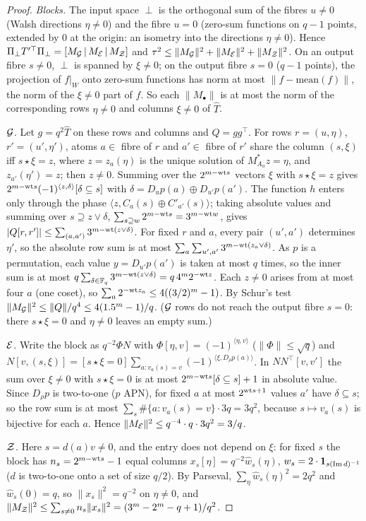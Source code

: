 \begin{proof}
\emph{Blocks.} The input space $\perp$ is the orthogonal sum of the fibres $u\ne0$ (Walsh directions $\eta\ne0$)
and the fibre $u=0$ (zero-sum functions on $q-1$ points, extended by $0$ at the origin: an isometry into the
directions $\eta\ne0$). Hence $\Pi_\perp T'^\top\Pi_\perp=[M_{\mathcal{G}}\,|\,M_{\mathcal{E}}\,|\,M_{\mathcal{Z}}]$ and
$\tau^2\le\|M_{\mathcal{G}}\|^2+\|M_{\mathcal{E}}\|^2+\|M_{\mathcal{Z}}\|^2$. On an output fibre $s\ne0$, $\perp$ is spanned by $\xi\ne0$; on the
output fibre $s=0$ ($q-1$ points), the projection of $f|_W$ onto zero-sum functions has norm at most
$\|f-\mathrm{mean}(f)\|$, the norm of the $\xi\ne0$ part of $f$. So each $\|M_\bullet\|$ is at most the norm of the
corresponding rows $\eta\ne0$ and columns $\xi\ne0$ of $\widehat T$.

\emph{$\mathcal{G}$.} Let $g=q^2\widehat T$ on these rows and columns and $Q=gg^\top$. For rows $r=(u,\eta)$, $r'=(u',\eta')$,
atoms $a\in$ fibre of $r$ and $a'\in$ fibre of $r'$ share the column $(s,\xi)$ iff $s\star\xi=z$, where $z=z_a(\eta)$ is the
unique solution of $M^\ast_{A_a}z=\eta$, and $z_{a'}(\eta')=z$; then $z\ne0$. Summing over the $2^{m-\mathrm{wt} s}$ vectors $\xi$
with $s\star\xi=z$ gives $2^{m-\mathrm{wt} s}(-1)^{\langle z,\delta\rangle}[\delta\subseteq s]$ with
$\delta=D_up(a)\oplus D_{u'}p(a')$. The function $h$ enters only through the phase $\langle z,C_a(s)\oplus C'_{a'}(s)\rangle$;
taking absolute values and summing over $s\supseteq z\vee\delta$, $\sum_{s\supseteq w}2^{m-\mathrm{wt} s}=3^{m-\mathrm{wt} w}$, gives
$|Q[r,r']|\le\sum_{(a,a')}3^{m-\mathrm{wt}(z\vee\delta)}$. For fixed $r$ and $a$, every pair $(u',a')$ determines $\eta'$, so the
absolute row sum is at most $\sum_a\sum_{u',a'}3^{m-\mathrm{wt}(z_a\vee\delta)}$. As $p$ is a permutation, each value
$y=D_{u'}p(a')$ is taken at most $q$ times, so the inner sum is at most
$q\sum_{\delta\in\mathbb{F}_q}3^{m-\mathrm{wt}(z\vee\delta)}=q\,4^m2^{-\mathrm{wt} z}$. Each $z\ne0$ arises from at most four $a$ (one coset), so
$\sum_a2^{-\mathrm{wt} z_a}\le4((3/2)^m-1)$. By Schur's test $\|M_{\mathcal{G}}\|^2\le\|Q\|/q^4\le4(1.5^m-1)/q$. ($\mathcal{G}$ rows do not reach
the output fibre $s=0$: there $s\star\xi=0$ and $\eta\ne0$ leaves an empty sum.)

\emph{$\mathcal{E}$.} Write the block as $q^{-2}\Phi N$ with $\Phi[\eta,v]=(-1)^{\langle\eta,v\rangle}$ ($\|\Phi\|\le\sqrt q$) and
$N[v,(s,\xi)]=[s\star\xi=0]\sum_{a:v_a(s)=v}(-1)^{\langle\xi,D_\rho p(a)\rangle}$. In $NN^\top[v,v']$ the sum over $\xi\ne0$
with $s\star\xi=0$ is at most $2^{m-\mathrm{wt} s}[\delta\subseteq s]+1$ in absolute value. Since $D_\rho p$ is two-to-one ($p$ APN),
for fixed $a$ at most $2^{\mathrm{wt} s+1}$ values $a'$ have $\delta\subseteq s$; so the row sum is at most
$\sum_s\#\{a:v_a(s)=v\}\cdot3q=3q^2$, because $s\mapsto v_a(s)$ is bijective for each $a$. Hence
$\|M_{\mathcal{E}}\|^2\le q^{-4}\cdot q\cdot3q^2=3/q$.

\emph{$\mathcal{Z}$.} Here $s=d(a)v\ne0$, and the entry does not depend on $\xi$: for fixed $s$ the block has
$n_s=2^{m-\mathrm{wt} s}-1$ equal columns $x_s[\eta]=q^{-2}\widehat w_s(\eta)$, $w_s=2\cdot\mathbf 1_{s(\mathrm{Im}\, d)^{-1}}$
($d$ is two-to-one onto a set of size $q/2$). By Parseval, $\sum_\eta\widehat w_s(\eta)^2=2q^2$ and $\widehat w_s(0)=q$,
so $\|x_s\|^2=q^{-2}$ on $\eta\ne0$, and $\|M_{\mathcal{Z}}\|^2\le\sum_{s\ne0}n_s\|x_s\|^2=(3^m-2^m-q+1)/q^2$.
\end{proof}
